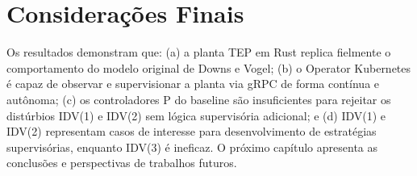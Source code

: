 \section{Considerações Finais}
\label{sec:res_conclusao}

Os resultados demonstram que: (a) a planta TEP em Rust replica fielmente o comportamento do modelo original de Downs e Vogel; (b) o Operator Kubernetes é capaz de observar e supervisionar a planta via gRPC de forma contínua e autônoma; (c) os controladores P do baseline são insuficientes para rejeitar os distúrbios IDV(1) e IDV(2) sem lógica supervisória adicional; e (d) IDV(1) e IDV(2) representam casos de interesse para desenvolvimento de estratégias supervisórias, enquanto IDV(3) é ineficaz. O próximo capítulo apresenta as conclusões e perspectivas de trabalhos futuros.
